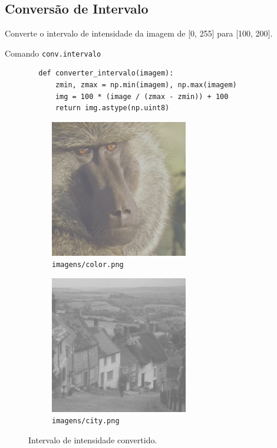 \subsection{Conversão de Intervalo}

Converte o intervalo de intensidade da imagem de [0, 255] para [100, 200].

\begin{listing}[h]
    \caption{Comando \texttt{conv.intervalo}}

    \begin{verbatim}
        def converter_intervalo(imagem):
            zmin, zmax = np.min(imagem), np.max(imagem)
            img = 100 * (image / (zmax - zmin)) + 100
            return img.astype(np.uint8)
    \end{verbatim}
\end{listing}

\begin{figure}[h]
    \centering
    \begin{subfigure}{0.45\textwidth}
        \centering
        \includegraphics[width=6cm]{resultados/colorconv.png}
        \caption{\texttt{imagens/color.png}}
    \end{subfigure}%
    \begin{subfigure}{0.45\textwidth}
        \centering
        \includegraphics[width=6cm]{resultados/cityconv.png}
        \caption{\texttt{imagens/city.png}}
    \end{subfigure}

    \caption{Intervalo de intensidade convertido.}
\end{figure}
